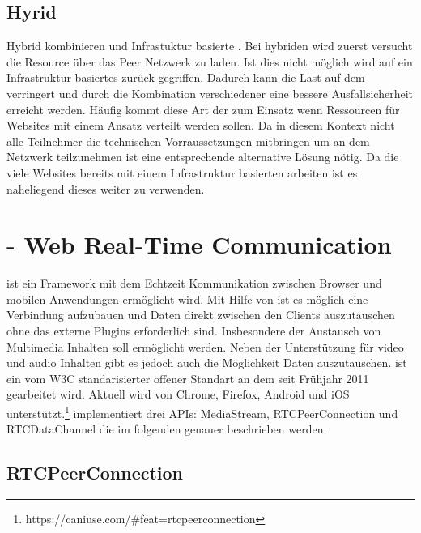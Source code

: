\subsection{Hyrid \cdns}
Hybrid \cdns kombinieren \pTp \cdns und Infrastuktur basierte \cdns. Bei hybriden \cdns wird zuerst versucht die Resource über das Peer Netzwerk zu laden. Ist dies nicht möglich wird auf ein Infrastruktur basiertes \cdn zurück gegriffen. Dadurch kann die Last auf dem \cdn verringert und durch die Kombination verschiedener \cdns eine bessere Ausfallsicherheit erreicht werden. Häufig kommt diese Art der \cdns zum Einsatz wenn Ressourcen für Websites mit einem \pTp Ansatz verteilt werden sollen. Da in diesem Kontext nicht alle Teilnehmer die technischen Vorraussetzungen mitbringen um an dem \pTp Netzwerk teilzunehmen ist eine entsprechende alternative Lösung nötig. Da die viele Websites bereits mit einem Infrastruktur basierten \cdn arbeiten ist es naheliegend dieses weiter zu verwenden.

\section{\webrtc - Web Real-Time Communication}

\webrtc ist ein Framework mit dem Echtzeit Kommunikation zwischen Browser und mobilen Anwendungen ermöglicht wird. Mit Hilfe von \webrtc ist es möglich eine \pTp Verbindung aufzubauen und Daten direkt zwischen den Clients auszutauschen ohne das externe Plugins erforderlich sind. Insbesondere der Austausch von Multimedia Inhalten soll ermöglicht werden. Neben der Unterstützung für video und audio Inhalten gibt es jedoch auch die Möglichkeit Daten auszutauschen. \webrtc ist ein vom W3C\cite{w3Webrtc} standarisierter offener Standart an dem seit Frühjahr 2011 gearbeitet wird. Aktuell wird \webrtc von Chrome, Firefox, Android und iOS unterstützt.\footnote{https://caniuse.com/\#feat=rtcpeerconnection} \webrtc implementiert drei APIs: MediaStream, RTCPeerConnection und RTCDataChannel die im folgenden genauer beschrieben werden.





\subsection{RTCPeerConnection}

